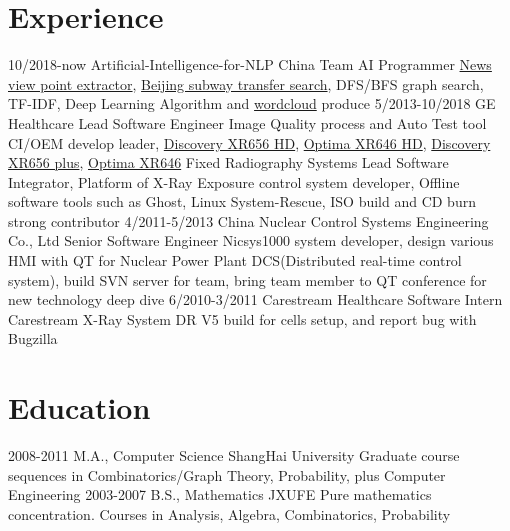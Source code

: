 \documentclass[letterpaper,10pt]{Resume_Liang}
\begin{document}
\begin{body}
\section{Experience}
\begin{entrylist}
  \entry
    {10/2018-now}
    {Artificial-Intelligence-for-NLP China Team}
    {AI Programmer}
    {\href{https://github.com/wangliangster/TestWL/blob/master/ViewPointExtract.ipynb}{News view point extractor}, \href{https://github.com/wangliangster/NLP-Course/blob/master/BeijingSubway.ipynb}{Beijing subway transfer search}, DFS/BFS graph search, TF-IDF, Deep Learning Algorithm and \href{https://github.com/wangliangster/TestWL/blob/master/wordcloudLiang.ipynb}{wordcloud} produce }	
  \entry
    {5/2013-10/2018}
    {GE Healthcare}
    {Lead Software Engineer}
    {Image Quality process and Auto Test tool  CI/OEM develop leader, \href{https://www.gehealthcare.com/en/products/radiography/fixed-rad-systems/discovery-xr656-hd-x-ray-system-powered-by-helix}{Discovery XR656 HD}, \href{https://www.gehealthcare.com/en/products/radiography/fixed-rad-systems/optima-xr646-hd-x-ray-system-powered-by-helix}{Optima XR646 HD}, \href{https://www.gehealthcare.com/en/products/radiography/fixed-rad-systems/discovery-xr656-plus}{Discovery XR656 plus}, \href{https://www.gehealthcare.com/en/products/radiography/fixed-rad-systems/optima-xr646}{Optima XR646} Fixed Radiography Systems Lead Software Integrator, Platform of X-Ray Exposure control system developer, Offline software tools such as Ghost, Linux System-Rescue, ISO build and CD burn strong contributor}
  \entry
    {4/2011-5/2013}
    {China Nuclear Control Systems Engineering Co., Ltd}
    {Senior Software Engineer}
    {Nicsys1000 system developer, design various HMI with QT for Nuclear Power Plant DCS(Distributed real-time control system), build SVN server for team, bring team member to QT conference for new technology deep dive }
  \entry
    {6/2010-3/2011}
    {Carestream Healthcare}
    {Software Intern}
    {Carestream X-Ray System DR V5 build for cells setup, and report bug with Bugzilla}
\end{entrylist}


\section{Education}
\begin{entrylist}
  \entry
    {2008-2011}
    {M.A., Computer Science}
    {ShangHai University}
    {Graduate course sequences in Combinatorics/Graph Theory, Probability, plus Computer Engineering }
  \entry
    {2003-2007}
    {B.S., Mathematics}
    {JXUFE}
    {Pure mathematics concentration. Courses in Analysis, Algebra, Combinatorics, Probability}
\end{entrylist}



\end{body}
\end{document}
